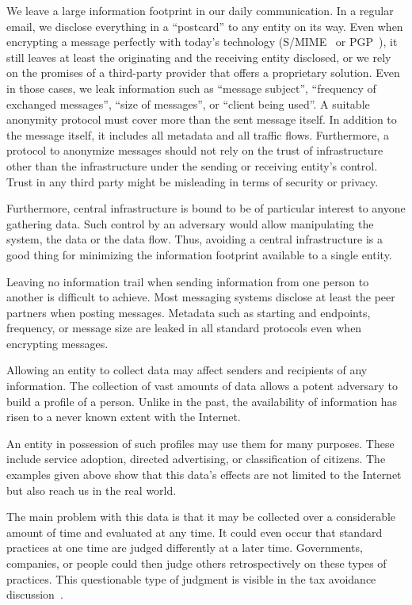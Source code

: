 We leave a large information footprint in our daily communication. In a regular email, we disclose everything in a ``postcard'' to any entity on its way. Even when encrypting a message perfectly with today's technology (S/MIME~\cite{rfc2045} or PGP~\cite{rfc2015}), it still leaves at least the originating and the receiving entity disclosed, or we rely on the promises of a third-party provider that offers a proprietary solution. Even in those cases, we leak information such as ``message subject'', ``frequency of exchanged messages'', ``size of messages'', or ``client being used''. A suitable anonymity protocol must cover more than the sent message itself. In addition to the message itself, it includes all metadata and all traffic flows. Furthermore, a protocol to anonymize messages should not rely on the trust of infrastructure other than the infrastructure under the sending or receiving entity's control. Trust in any third party might be misleading in terms of security or privacy.

Furthermore, central infrastructure is bound to be of particular interest to anyone gathering data. Such control by an adversary would allow manipulating the system, the data or the data flow. Thus, avoiding a central infrastructure is a good thing for minimizing the information footprint available to a single entity.

Leaving no information trail when sending information from one person to another is difficult to achieve. Most messaging systems disclose at least the peer partners when posting messages. Metadata such as starting and endpoints, frequency, or message size are leaked in all standard protocols even when encrypting messages.

Allowing an entity to collect data may affect senders and recipients of any information. The collection of vast amounts of data allows a potent adversary to build a profile of a person. Unlike in the past, the availability of information has risen to a never known extent with the Internet.

An entity in possession of such profiles may use them for many purposes. These include service adoption, directed advertising, or classification of citizens. The examples given above show that this data's effects are not limited to the Internet but also reach us in the real world.

The main problem with this data is that it may be collected over a considerable amount of time and evaluated at any time. It could even occur that standard practices at one time are judged differently at a later time. Governments, companies, or people could then judge others retrospectively on these types of practices. This questionable type of judgment is visible in the tax avoidance discussion~\cite{Amat1999}. 

